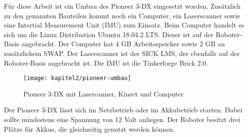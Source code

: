 Für diese Arbeit ist ein Umbau des Pioneer 3-DX eingesetzt worden. Zusätzlich zu den genannten Bauteilen kommt noch ein Computer, ein Laserscanner sowie eine Intertial Measurement Unit (IMU) zum Einsatz. Beim Computer handelt es sich um die Linux Distribution Ubuntu 18.04.2 LTS. Dieser ist auf der Roboter-Basis angebracht. Der Computer hat 4 GB Arbeitsspeicher sowie 2 GB an zusätzlichem SWAP. Der Laserscanner ist der SICK LMS, der ebenfalls auf der Roboter-Basis angebracht ist. Die IMU ist die Tinkerforge Brick 2.0.

\begin{figure}[t]
  \centering
  \texttt{[image: kapitel2/pioneer-umbau]}
  \caption{Pioneer 3-DX mit Lasercanner, Kinect und Computer}
  \label{Kap2:Pioneer3DX}
\end{figure}

Der Pioneer 3-DX lässt sich im Netzbetrieb oder im Akkubetrieb starten. Dabei sollte mindestens eine Spannung von 12 Volt anliegen. Der Roboter besitzt drei Plätze für Akkus, die gleichzeitig genutzt werden können. \autocite{pioneer3operationsmanual}